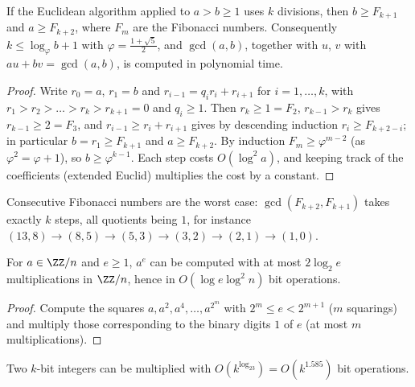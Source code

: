 \begin{theorem}[Lamé]\label{cryptography:theorem-lame}
If the Euclidean algorithm applied to $a > b \geq 1$ uses $k$ divisions, then $b \geq F_{k+1}$ and $a \geq F_{k+2}$, where $F_m$ are the Fibonacci numbers. Consequently $k \leq \log_\varphi b + 1$ with
$\varphi = \frac{1 + \sqrt5}{2}$, and $\gcd(a, b)$, together with $u$, $v$ with $au + bv = \gcd(a, b)$, is computed in polynomial time.
\end{theorem}

\begin{proof}
Write $r_0 = a$, $r_1 = b$ and $r_{i-1} = q_ir_i + r_{i+1}$ for $i = 1, \dots, k$, with $r_1 > r_2 > \dots > r_k > r_{k+1} = 0$ and $q_i \geq 1$. Then $r_k \geq 1 = F_2$, $r_{k-1} > r_k$ gives $r_{k-1} \geq 2 = F_3$,
and $r_{i-1} \geq r_i + r_{i+1}$ gives by descending induction $r_i \geq F_{k+2-i}$; in particular $b = r_1 \geq F_{k+1}$ and $a \geq F_{k+2}$. By induction $F_m \geq \varphi^{m-2}$ (as $\varphi^2 = \varphi + 1$), so
$b \geq \varphi^{k-1}$. Each step costs $O(\log^2a)$, and keeping track of the coefficients (extended Euclid) multiplies the cost by a constant.
\end{proof}

\begin{example}\label{cryptography:example-lame}
Consecutive Fibonacci numbers are the worst case: $\gcd(F_{k+2}, F_{k+1})$ takes exactly $k$ steps, all quotients being $1$, for instance $(13, 8) \to (8, 5) \to (5, 3) \to (3, 2) \to (2, 1) \to (1, 0)$.
\end{example}

\begin{proposition}\label{cryptography:proposition-exponentiation}
For $a \in \ZZ/n$ and $e \geq 1$, $a^e$ can be computed with at most $2\log_2e$ multiplications in $\ZZ/n$, hence in $O(\log e\log^2n)$ bit operations.
\end{proposition}

\begin{proof}
Compute the squares $a, a^2, a^4, \dots, a^{2^m}$ with $2^m \leq e < 2^{m+1}$ ($m$ squarings) and multiply those corresponding to the binary digits $1$ of $e$ (at most $m$ multiplications).
\end{proof}

\begin{proposition}[Karatsuba]\label{cryptography:proposition-karatsuba}
Two $k$-bit integers can be multiplied with $O(k^{\log_23}) = O(k^{1.585})$ bit operations.
\end{proposition}

